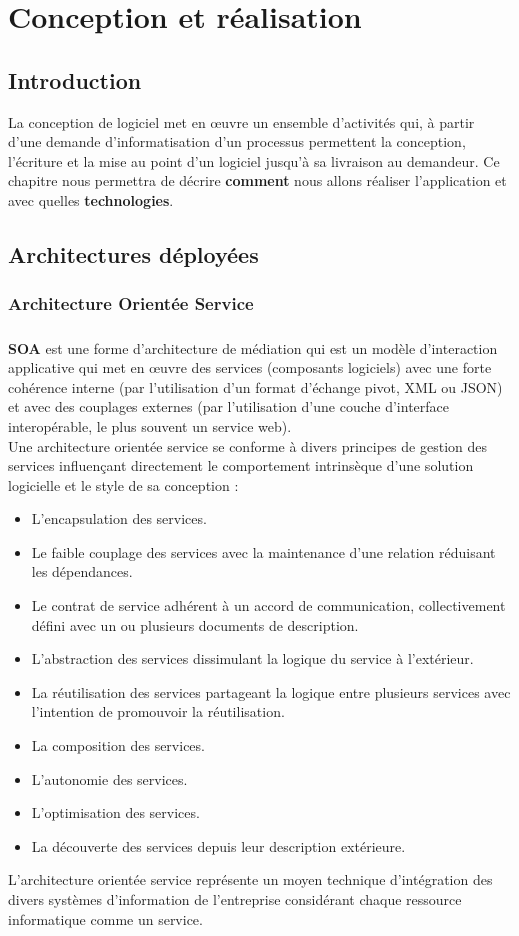 \documentclass[12pt]{report}
\begin{document}
    \chapter{Conception et réalisation}
      \section{Introduction}
	La conception de logiciel met en œuvre un ensemble d'activités qui, à partir d'une demande d'informatisation d'un processus permettent la conception, l'écriture et la mise au point d'un logiciel jusqu'à sa livraison au demandeur. Ce chapitre nous permettra de décrire \textbf{comment} nous allons réaliser l'application et avec quelles \textbf{technologies}.
	
      \section{Architectures déployées}
	\subsection{Architecture Orientée Service}
	  \paragraph{}
	    \textbf{\gls{SOA}} est une forme d'architecture de médiation qui est un modèle d'interaction applicative qui met en œuvre des services (composants logiciels) avec une forte cohérence interne (par l'utilisation d'un format d'échange pivot, XML ou JSON) et avec des couplages externes (par l'utilisation d'une couche d'interface interopérable, le plus souvent un service web).
	    \\Une architecture orientée service se conforme à divers principes de gestion des services influençant directement le comportement intrinsèque d’une solution logicielle et le style de sa conception :
	      \begin{itemize}
		\item L’encapsulation des services.
		\item Le faible couplage des services avec la maintenance d’une relation réduisant les dépendances.
		\item Le contrat de service adhérent à un accord de communication, collectivement défini avec un ou plusieurs documents de description.
		\item L’abstraction des services dissimulant la logique du service à l’extérieur.
		\item La réutilisation des services partageant la logique entre plusieurs services avec l’intention de promouvoir la réutilisation.
		\item La composition des services.
		\item L’autonomie des services.
		\item L’optimisation des services.
		\item La découverte des services depuis leur description extérieure.
	      \end{itemize}
	      L’architecture orientée service représente un moyen technique d’intégration des divers systèmes d’information de l’entreprise considérant chaque ressource informatique comme un service.
	      
\end{document}
